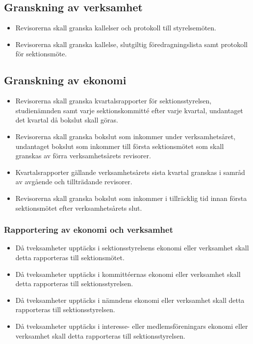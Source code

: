 \subsection{Granskning av verksamhet}
\begin{itemize}
\item Revisorerna skall granska kallelser och protokoll till styrelsemöten.
\item Revisorerna skall granska kallelse, slutgiltig föredragningslista samt protokoll för sektionsmöte.
\end{itemize}


\subsection{Granskning av ekonomi}
\begin{itemize}
\item Revisorerna skall granska kvartalsrapporter för sektionsstyrelsen, studienämnden samt varje sektionskommitté efter varje kvartal, undantaget det kvartal då bokslut skall göras.

\item Revisorerna skall granska bokslut som inkommer under verksamhetsåret, undantaget bokslut som inkommer till första sektionsmötet som skall granskas av förra verksamhetsårets revisorer.

\item Kvartalsrapporter gällande verksamhetsårets sista kvartal granskas i samråd av avgående och tillträdande revisorer.

\item Revisorerna skall granska bokslut som inkommer i tillräcklig tid innan första sektionsmötet efter verksamhetsårets slut.

\end{itemize}

\subsubsection{Rapportering av ekonomi och verksamhet}
\begin{itemize}
\item Då tveksamheter upptäcks i sektionsstyrelsens ekonomi eller verksamhet skall detta rapporteras till sektionsmötet.

\item Då tveksamheter upptäcks i kommittéernas ekonomi eller verksamhet skall detta rapporteras till sektionsstyrelsen.

\item Då tveksamheter upptäcks i nämndens ekonomi eller verksamhet skall detta rapporteras till sektionsstyrelsen.

\item Då tveksamheter upptäcks i interesse- eller medlemsföreningars ekonomi eller verksamhet skall detta rapporteras till sektionsstyrelsen.

\end{itemize}

